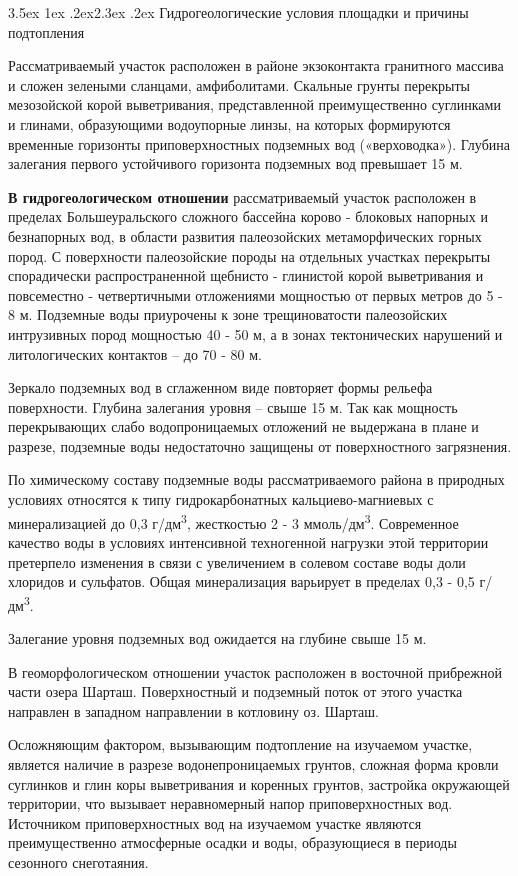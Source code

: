 \documentclass[a4paper,12pt]{article} %
\makeatletter
\renewcommand\section{\@startsection {section}{1}{\parindent}%
	{3.5ex \@plus 1ex \@minus .2ex}{2.3ex \@plus.2ex}%
	{\normalfont\hyphenpenalty=10000\Large\bfseries}}
\makeatother
\begin{document}
\section{Гидрогеологические условия площадки и причины подтопления}

Рассматриваемый участок расположен в районе экзоконтакта гранитного массива и сложен зелеными сланцами, амфиболитами. Скальные грунты перекрыты мезозойской корой выветривания, представленной преимущественно суглинками и глинами, образующими водоупорные линзы, на которых формируются временные горизонты приповерхностных подземных вод («верховодка»). Глубина залегания первого устойчивого горизонта подземных вод превышает 15 м.

\textbf{В гидрогеологическом отношении} рассматриваемый участок расположен в пределах Большеуральского сложного бассейна корово - блоковых напорных и безнапорных вод, в области развития палеозойских метаморфических горных пород. С поверхности палеозойские породы на отдельных участках перекрыты спорадически распространенной щебнисто - глинистой корой выветривания и повсеместно - четвертичными отложениями мощностью от первых метров до 5 - 8 м. Подземные воды приурочены к зоне трещиноватости палеозойских интрузивных пород мощностью 40 - 50 м, а в зонах тектонических нарушений и литологических контактов -- до 70 - 80 м. 

Зеркало подземных вод в сглаженном виде повторяет формы рельефа поверхности. Глубина залегания уровня – свыше 15 м. Так как мощность перекрывающих слабо водопроницаемых отложений не выдержана в плане и разрезе, подземные воды недостаточно защищены от поверхностного загрязнения.

По химическому составу подземные воды рассматриваемого района в природных условиях относятся к типу гидрокарбонатных кальциево-магниевых с минерализацией до 0,3 г/дм\textsuperscript{3}, жесткостью 2 - 3 ммоль/дм\textsuperscript{3}. Современное качество воды в условиях интенсивной техногенной нагрузки этой территории претерпело изменения в связи с увеличением в солевом составе воды доли хлоридов и сульфатов. Общая минерализация варьирует в пределах 0,3 - 0,5 г/дм\textsuperscript{3}.

Залегание уровня подземных вод ожидается на глубине свыше 15 м.

В геоморфологическом отношении участок расположен в восточной прибрежной части озера Шарташ. Поверхностный и подземный поток от этого участка направлен в западном направлении в котловину оз. Шарташ.

Осложняющим фактором, вызывающим подтопление на изучаемом участке, является наличие в разрезе водонепроницаемых грунтов, сложная форма кровли суглинков и глин коры выветривания и коренных грунтов, застройка окружающей территории, что вызывает неравномерный напор приповерхностных вод. Источником приповерхностных вод на изучаемом участке являются преимущественно атмосферные осадки и воды, образующиеся в периоды сезонного снеготаяния.
\end{document}
